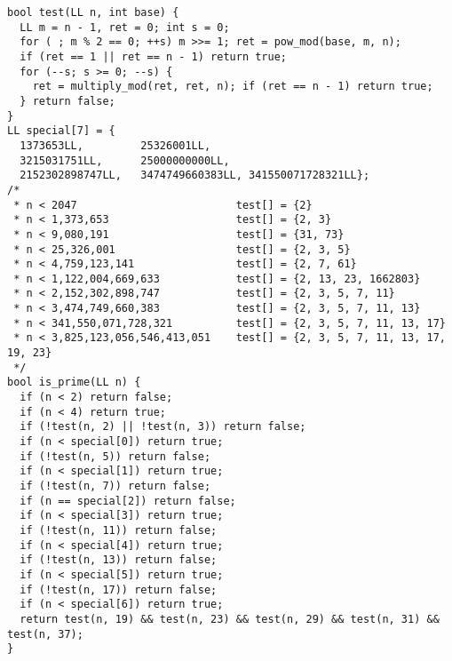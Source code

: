 \begin{lstlisting}
bool test(LL n, int base) {
  LL m = n - 1, ret = 0; int s = 0;
  for ( ; m % 2 == 0; ++s) m >>= 1; ret = pow_mod(base, m, n);
  if (ret == 1 || ret == n - 1) return true;
  for (--s; s >= 0; --s) {
    ret = multiply_mod(ret, ret, n); if (ret == n - 1) return true;
  } return false;
}
LL special[7] = {
  1373653LL,         25326001LL, 
  3215031751LL,      25000000000LL,
  2152302898747LL,   3474749660383LL, 341550071728321LL};
/*
 * n < 2047                         test[] = {2}
 * n < 1,373,653                    test[] = {2, 3}
 * n < 9,080,191                    test[] = {31, 73}
 * n < 25,326,001                   test[] = {2, 3, 5}
 * n < 4,759,123,141                test[] = {2, 7, 61}
 * n < 1,122,004,669,633            test[] = {2, 13, 23, 1662803}
 * n < 2,152,302,898,747            test[] = {2, 3, 5, 7, 11}
 * n < 3,474,749,660,383            test[] = {2, 3, 5, 7, 11, 13}
 * n < 341,550,071,728,321          test[] = {2, 3, 5, 7, 11, 13, 17}
 * n < 3,825,123,056,546,413,051    test[] = {2, 3, 5, 7, 11, 13, 17, 19, 23}
 */
bool is_prime(LL n) {
  if (n < 2) return false;
  if (n < 4) return true;
  if (!test(n, 2) || !test(n, 3)) return false;
  if (n < special[0]) return true;
  if (!test(n, 5)) return false;
  if (n < special[1]) return true;
  if (!test(n, 7)) return false;
  if (n == special[2]) return false;
  if (n < special[3]) return true;
  if (!test(n, 11)) return false;
  if (n < special[4]) return true;
  if (!test(n, 13)) return false;
  if (n < special[5]) return true;
  if (!test(n, 17)) return false;
  if (n < special[6]) return true;
  return test(n, 19) && test(n, 23) && test(n, 29) && test(n, 31) && test(n, 37);
}
\end{lstlisting}